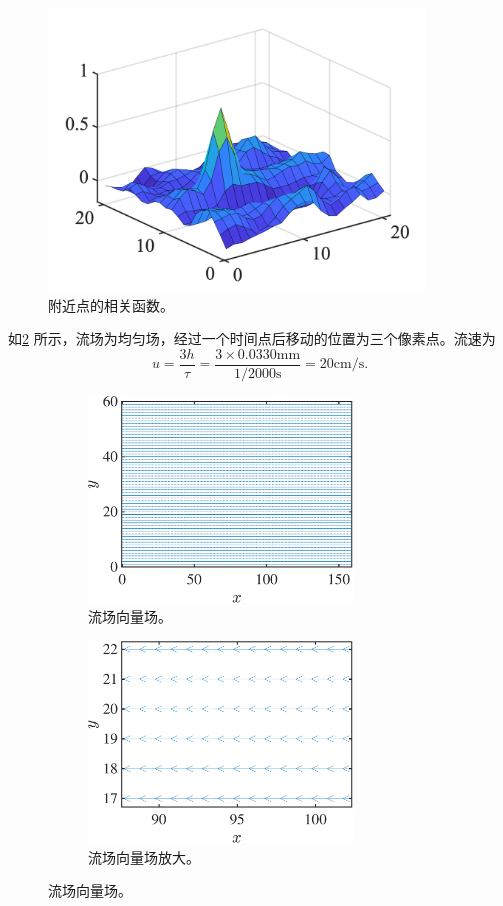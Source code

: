 \documentclass[12pt]{article}
\begin{document}
\begin{figure}[htp]
	\centering
	\includegraphics[width=10cm]{corr}
	\caption{附近点的相关函数。}
	\label{fig:2}
\end{figure}

如\cref{fig:3} 所示，流场为均匀场，经过一个时间点后移动的位置为三个像素点。流速为
\begin{equation}
	u = \frac{3h}{\tau} = \frac{3\times 0.0330 \mathrm{mm}}{1/2000 \mathrm{s}} = 20 \mathrm{cm/s}.
\end{equation}

\begin{figure}[htp]

	\centering
	\begin{subfigure}[b]{0.49\textwidth}
		\centering
		\includegraphics[width=7cm]{Velocity.pdf}
		\vspace{0.35cm}
		\caption{流场向量场。}
	\end{subfigure}
	\hfill
	\begin{subfigure}[b]{0.49\textwidth}
		\centering
		\includegraphics[width=7cm]{VelocityMag.pdf}
		\vspace{0.35cm}
		\caption{流场向量场放大。}
	\end{subfigure}
	\caption{流场向量场。}
	\label{fig:3}
\end{figure}
\end{document}
